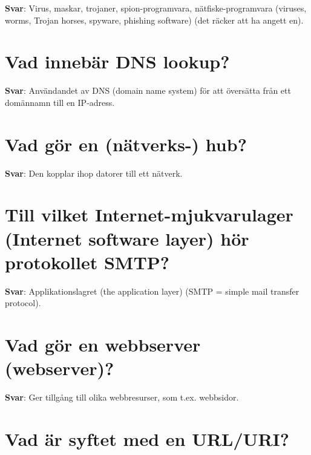 \documentclass[a4paper,11pt,oneside]{book}
\begin{document}
\begin{sloppypar}
\label{q:142:sa:sv:True}

\textbf{Svar}: Virus, maskar, trojaner, spion-programvara, n\"atfiske-programvara (viruses, worms, Trojan horses, spyware, phishing software) (det r\"acker att ha angett en).



\section{Vad inneb\"ar DNS lookup?}

\label{q:143:sa:sv:True}

\textbf{Svar}: Anv\"andandet av DNS (domain name system) f\"or att \"overs\"atta fr\r{a}n ett dom\"annamn till en IP-adress.



\section{Vad g\"or en (n\"atverks-) hub?}

\label{q:144:sa:sv:True}

\textbf{Svar}: Den kopplar ihop datorer till ett n\"atverk.



\section{Till vilket Internet-mjukvarulager (Internet software layer) h\"or protokollet SMTP?}

\label{q:145:sa:sv:True}

\textbf{Svar}: Applikationslagret (the application layer) (SMTP = simple mail transfer protocol).



\section{Vad g\"or en webbserver (webserver)?}

\label{q:146:sa:sv:True}

\textbf{Svar}: Ger tillg\r{a}ng till olika webbresurser, som t.ex. webbsidor.



\section{Vad \"ar syftet med en URL/URI?}

\label{q:147:sa:sv:True}


\end{sloppypar}
\end{document}
